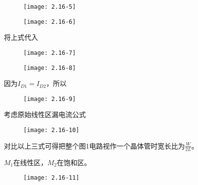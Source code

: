 \begin{figure}[H] %
	\begin{minipage}{\linewidth}
		\texttt{[image: 2.16-5]}
	\end{minipage}
\end{figure}

\begin{figure}[H] %
	\begin{minipage}{\linewidth}
		\texttt{[image: 2.16-6]}
	\end{minipage}
\end{figure}

将上式代入

\begin{figure}[H] %
	\begin{minipage}{\linewidth}
		\texttt{[image: 2.16-7]}
	\end{minipage}
\end{figure}

\begin{figure}[H] %
	\begin{minipage}{\linewidth}
		\texttt{[image: 2.16-8]}
	\end{minipage}
\end{figure}

因为$I_{D1}=I_{D2}$，所以

\begin{figure}[H] %
	\begin{minipage}{\linewidth}
		\texttt{[image: 2.16-9]}
	\end{minipage}
\end{figure}

考虑原始线性区漏电流公式

\begin{figure}[H] %
	\begin{minipage}{\linewidth}
		\texttt{[image: 2.16-10]}
	\end{minipage}
\end{figure}

对比以上三式可得把整个图1电路视作一个晶体管时宽长比为$\frac{W}{2L}$。

\scalebox{3}{（2）}

$M_1$在线性区，$M_2$在饱和区。

\begin{figure}[H] %
	\begin{minipage}{\linewidth}
		\texttt{[image: 2.16-11]}
	\end{minipage}
\end{figure}

